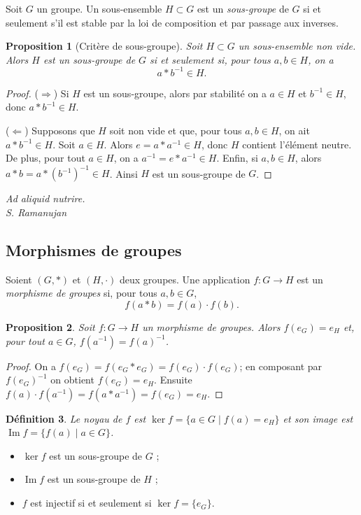 \documentclass[11pt]{article}
\newtheorem{definition}{Définition}[section]
\newtheorem{proposition}[definition]{Proposition}
\theoremstyle{definition}
\begin{document}
Soit $G$ un groupe. Un sous-ensemble $H\subset G$ est un \emph{sous-groupe}
de $G$ si et seulement s'il est stable par la loi de composition et par
passage aux inverses.

\begin{proposition}[Critère de sous-groupe]
Soit $H\subset G$ un sous-ensemble non vide. Alors $H$ est un sous-groupe de
$G$ si et seulement si, pour tous $a,b\in H$, on a
\[ a\ast b^{-1}\in H. \]
\end{proposition}

\begin{proof}
($\Rightarrow$) Si $H$ est un sous-groupe, alors par stabilité on a $a\in H$
et $b^{-1}\in H$, donc $a\ast b^{-1}\in H$.

($\Leftarrow$) Supposons que $H$ soit non vide et que, pour tous
$a,b\in H$, on ait $a\ast b^{-1}\in H$. Soit $a\in H$. Alors
$e = a\ast a^{-1}\in H$, donc $H$ contient l'élément neutre. De plus, pour
tout $a\in H$, on a $a^{-1} = e\ast a^{-1}\in H$. Enfin, si $a,b\in H$, alors
$a\ast b = a\ast(b^{-1})^{-1}\in H$. Ainsi $H$ est un sous-groupe de $G$.
\end{proof}

\begin{flushright}\small\itshape
Ad aliquid nutrire.\\ S. Ramanujan
\end{flushright}

\newpage

\subsection{Morphismes de groupes}

Soient $(G,\ast)$ et $(H,\cdot)$ deux groupes. Une application
$f : G\to H$ est un \emph{morphisme de groupes} si, pour tous $a,b\in G$,
\[ f(a\ast b) = f(a)\cdot f(b). \]

\begin{proposition}
Soit $f : G\to H$ un morphisme de groupes. Alors $f(e_G) = e_H$ et, pour
tout $a\in G$, $f(a^{-1}) = f(a)^{-1}$.
\end{proposition}

\begin{proof}
On a $f(e_G) = f(e_G\ast e_G) = f(e_G)\cdot f(e_G)$; en composant par
$f(e_G)^{-1}$ on obtient $f(e_G) = e_H$. Ensuite
$f(a)\cdot f(a^{-1}) = f(a\ast a^{-1}) = f(e_G) = e_H$.
\end{proof}

\begin{definition}
Le \emph{noyau} de $f$ est $\ker f = \{a\in G \mid f(a) = e_H\}$ et son
\emph{image} est $\operatorname{Im} f = \{f(a) \mid a\in G\}$.
\end{definition}

\begin{itemize}
  \item $\ker f$ est un sous-groupe de $G$ ;
  \item $\operatorname{Im} f$ est un sous-groupe de $H$ ;
  \item $f$ est injectif si et seulement si $\ker f = \{e_G\}$.
\end{itemize}
\end{document}
